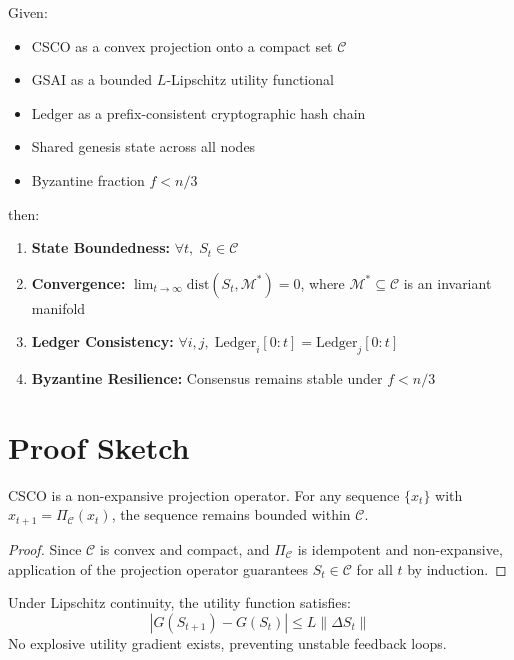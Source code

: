 \documentclass{article}
\begin{document}
\begin{theorem}
\label{thm:stability}
Given:
\begin{itemize}
    \item CSCO as a convex projection onto a compact set $\mathcal{C}$
    \item GSAI as a bounded $L$-Lipschitz utility functional
    \item Ledger as a prefix-consistent cryptographic hash chain
    \item Shared genesis state across all nodes
    \item Byzantine fraction $f < n/3$
\end{itemize}
then:
\begin{enumerate}
    \item \textbf{State Boundedness:} $\forall t,\; S_t \in \mathcal{C}$
    \item \textbf{Convergence:} $\lim_{t\to\infty} \text{dist}(S_t, \mathcal{M}^*) = 0$,
          where $\mathcal{M}^* \subseteq \mathcal{C}$ is an invariant manifold
    \item \textbf{Ledger Consistency:}
          $\forall i,j,\; \text{Ledger}_i[0:t] = \text{Ledger}_j[0:t]$
    \item \textbf{Byzantine Resilience:} Consensus remains stable under $f < n/3$
\end{enumerate}
\end{theorem}

\section{Proof Sketch}

\begin{lemma}
\label{lem:csco}
CSCO is a non-expansive projection operator.
For any sequence $\{x_t\}$ with $x_{t+1} = \Pi_{\mathcal{C}}(x_t)$,
the sequence remains bounded within $\mathcal{C}$.
\end{lemma}

\begin{proof}
Since $\mathcal{C}$ is convex and compact, and $\Pi_{\mathcal{C}}$ is
idempotent and non-expansive, application of the projection operator
guarantees $S_t \in \mathcal{C}$ for all $t$ by induction.
\end{proof}

\begin{lemma}
\label{lem:gsai}
Under Lipschitz continuity, the utility function satisfies:
\[
|G(S_{t+1}) - G(S_t)| \leq L \|\Delta S_t\|
\]
No explosive utility gradient exists, preventing unstable feedback loops.
\end{lemma}
\end{document}
